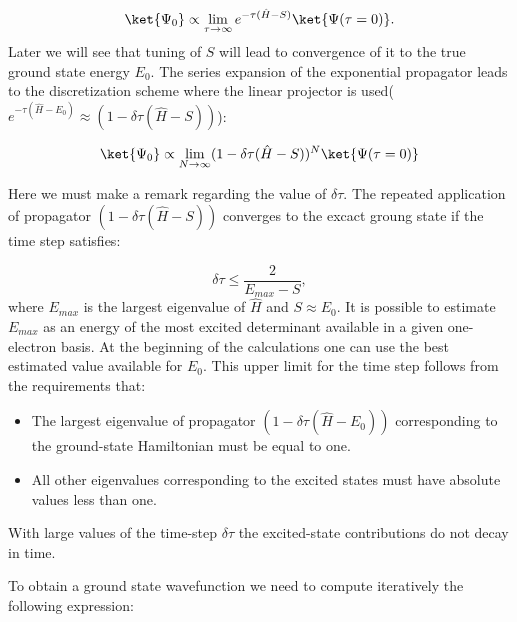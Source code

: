 \documentclass[twoside,english]{uiofysmaster}
\begin{document}
\begin{equation}\label{SEsolutionpropagator111}
\ket{\Psi_0} \propto \lim_{\tau \rightarrow \infty} e^{-\tau (\hat{H}-S)}\ket{\Psi(\tau = 0)}.
\end{equation}
Later we will see that tuning of $S$ will lead to convergence of it to the true ground state energy $E_0$. The series expansion of the exponential propagator leads to the discretization scheme where the linear projector is used($e^{-\tau (\hat{H}-E_0)} \approx (1 - \delta \tau (\hat{H}-S))$):

\begin{equation}\label{SEsolutionpropagator1111}
\ket{\Psi_0} \propto \lim_{N \rightarrow \infty} (1 - \delta \tau (\hat{H}-S))^N \ket{\Psi(\tau = 0)}
\end{equation}

Here we must make a remark regarding the value of $\delta \tau$. The repeated application of propagator $(1 - \delta \tau (\hat{H}-S))$ converges to the excact groung state if the time step satisfies:

\begin{equation}
\delta \tau \leq \frac{2}{E_{max} - S},
\end{equation}
where $E_{max}$ is the largest eigenvalue of $\hat{H}$ and $S \approx E_0$. It is possible to estimate $E_{max}$ as an energy of the most excited determinant available in a given one-electron basis. At the beginning of the calculations one can use the best estimated value available for $E_0$.
This upper limit for the time step follows from the requirements that:
\begin{itemize}
	\item The largest eigenvalue of propagator $(1 - \delta \tau (\hat{H}-E_0))$ corresponding to the ground-state Hamiltonian must be equal to one.
	\item All other eigenvalues corresponding to the excited states must have absolute values less than one.
\end{itemize}
With large values of the time-step $\delta \tau$ the excited-state contributions do not decay in time.

To obtain a ground state wavefunction we need to compute iteratively the following expression:
\end{document}
